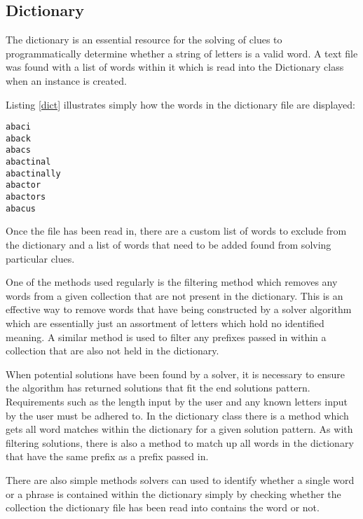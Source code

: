 \subsection{Dictionary}

The dictionary is an essential resource for the solving of clues to 
programmatically determine whether a string of letters is a valid word. 
A text file was found with a list of words within it which is read into the 
Dictionary class when an instance is created.

Listing \ref{dict} illustrates simply how the words in the dictionary file are
displayed:

\begin{lstlisting}[caption={A sample of the dictionary file},
                   label=dict]  
abaci
aback
abacs
abactinal
abactinally
abactor
abactors
abacus
\end{lstlisting}

Once the file has been read in, there are a custom list of words to  exclude
from the dictionary and a list of words that need to be added  found from
solving particular clues.

One of the methods used regularly is the filtering method which removes any
words from a given collection that are not present in the dictionary. This is an
effective way to remove words that have being constructed by a solver algorithm
which are essentially just an assortment of letters which hold no identified
meaning.  A similar method is used to filter any prefixes passed in within a
collection that are  also not held in the dictionary.

When potential solutions have been found by a solver, it is necessary to ensure
the algorithm has returned solutions that fit the end solutions pattern.
Requirements  such as the length input by the user and any known letters input
by the user must  be adhered to. In the dictionary class there is a method which
gets all word matches  within the dictionary for a given solution pattern. As
with filtering solutions, there is  also a method to match up all words in the
dictionary that have the same prefix as  a prefix passed in.

There are also simple methods solvers can used to identify whether a single word
or a  phrase is contained within the dictionary simply by checking whether the
collection the  dictionary file has been read into contains the word or not.

